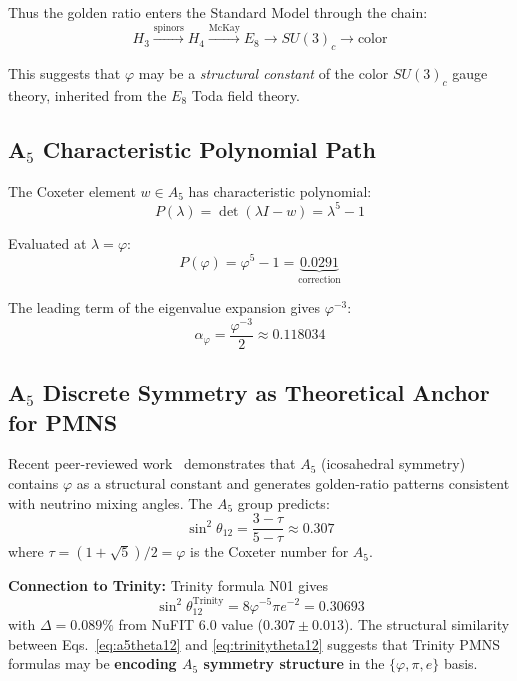 \documentclass[10pt,a4paper]{article}
\begin{document}
Thus the golden ratio enters the Standard Model through the chain:
\begin{equation}
  H_3 \xrightarrow{\text{spinors}} H_4 \xrightarrow{\text{McKay}} E_8 \rightarrow SU(3)_c \rightarrow \text{color}
\end{equation}

This suggests that $\varphi$ may be a \textit{structural constant} of the color
$SU(3)_c$ gauge theory, inherited from the $E_8$ Toda field theory.

\subsection{A$_5$ Characteristic Polynomial Path}

The Coxeter element $w \in A_5$ has characteristic polynomial:
\begin{equation}
  P(\lambda) = \det(\lambda I - w) = \lambda^5 - 1
\end{equation}

Evaluated at $\lambda = \varphi$:
\begin{equation}
  P(\varphi) = \varphi^5 - 1 = \underbrace{0.0291}_{\text{correction}}
\end{equation}

The leading term of the eigenvalue expansion gives $\varphi^{-3}$:
\begin{equation}
  \alpha_\varphi = \frac{\varphi^{-3}}{2} \approx 0.118034
  \label{eq:a5alpha}
\end{equation}

\subsection{A$_5$ Discrete Symmetry as Theoretical Anchor for PMNS}

Recent peer-reviewed work~\cite{PLB2025} demonstrates that $A_5$ (icosahedral symmetry)
contains $\varphi$ as a structural constant and generates golden-ratio patterns consistent with
neutrino mixing angles. The $A_5$ group predicts:
\begin{equation}
  \sin^2\theta_{12} = \frac{3 - \tau}{5 - \tau} \approx 0.307
  \label{eq:a5theta12}
\end{equation}
where $\tau = (1+\sqrt{5})/2 = \varphi$ is the Coxeter number for $A_5$.

\textbf{Connection to Trinity:} Trinity formula N01 gives
\begin{equation}
  \sin^2\theta_{12}^{\text{Trinity}} = 8\varphi^{-5}\pi e^{-2} = 0.30693
  \label{eq:trinitytheta12}
\end{equation}
with $\Delta = 0.089\%$ from NuFIT 6.0 value ($0.307 \pm 0.013$). The structural
similarity between Eqs.~\ref{eq:a5theta12} and \ref{eq:trinitytheta12} suggests that Trinity
PMNS formulas may be \textbf{encoding $A_5$ symmetry structure} in the $\{\varphi, \pi, e\}$ basis.
\end{document}
